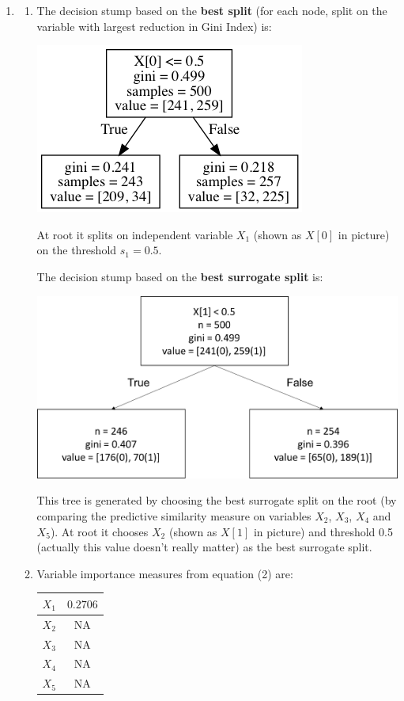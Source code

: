 \documentclass[paper=letter, fontsize=12pt]{article}
\begin{document}
\begin{enumerate}[label=(\alph*)]
	\item 
	\begin{enumerate}[label=(\roman*)]
		\item 
		The decision stump based on the \textbf{best split} (for each node, split on the variable with largest reduction in Gini Index) is:
		
		\includegraphics[scale=0.6]{tree_best_split.png}
		
		At root it splits on independent variable $X_1$ (shown as $X[0]$ in picture) on the threshold $s_1 = 0.5$.
		
		The decision stump based on the \textbf{best surrogate split} is:
		
		\includegraphics[scale=0.4]{tree_best_surrogate_split.png}
		
		This tree is generated by choosing the best surrogate split on the root (by comparing the predictive similarity measure on variables $X_2$, $X_3$, $X_4$ and $X_5$). At root it chooses $X_2$ (shown as $X[1]$ in picture) and threshold 0.5 (actually this value doesn't really matter) as the best surrogate split.
		
		\item Variable importance measures from equation (2) are:
		
		\begin{center}
			\begin{tabular}{|c|c|}
				\hline
				$X_1$ & $0.2706$ \\ \hline
				$X_2$ & NA \\ \hline
				$X_3$ & NA \\ \hline
				$X_4$ & NA \\ \hline
				$X_5$ & NA \\ \hline
			\end{tabular}
		\end{center}
			

\end{enumerate}
\end{enumerate}
\end{document}
